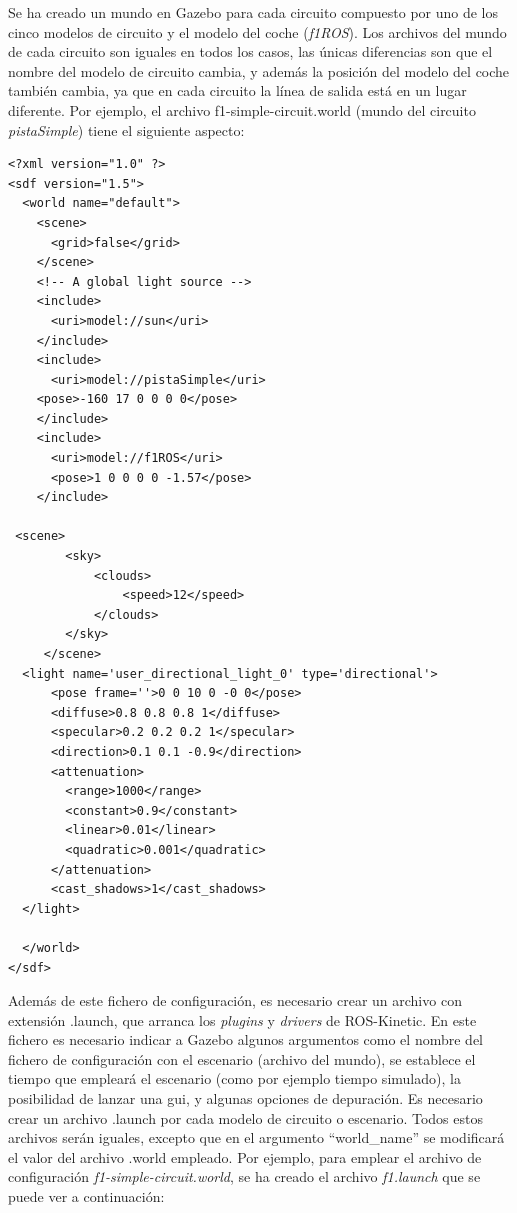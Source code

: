 Se ha creado un mundo en Gazebo para cada circuito compuesto por uno de los cinco modelos de circuito y el modelo del coche (\textit{f1ROS}). Los archivos del mundo de cada circuito son iguales en todos los casos, las únicas diferencias son que el nombre del modelo de circuito cambia, y además la posición del modelo del coche también cambia, ya que en cada circuito la línea de salida está en un lugar diferente. Por ejemplo, el archivo f1-simple-circuit.world (mundo del circuito \textit{pistaSimple}) tiene el
siguiente aspecto:

\vspace{20pt}
\begin{lstlisting}[frame=single]
<?xml version="1.0" ?>
<sdf version="1.5">
  <world name="default">
    <scene>
      <grid>false</grid>
    </scene>
    <!-- A global light source -->
    <include>
      <uri>model://sun</uri>
    </include>
    <include>
      <uri>model://pistaSimple</uri>
	<pose>-160 17 0 0 0 0</pose>
    </include>
    <include>
      <uri>model://f1ROS</uri>
      <pose>1 0 0 0 0 -1.57</pose>
    </include>

 <scene>
        <sky>
            <clouds>
                <speed>12</speed>
            </clouds>
        </sky>
     </scene>
  <light name='user_directional_light_0' type='directional'>
      <pose frame=''>0 0 10 0 -0 0</pose>
      <diffuse>0.8 0.8 0.8 1</diffuse>
      <specular>0.2 0.2 0.2 1</specular>
      <direction>0.1 0.1 -0.9</direction>
      <attenuation>
        <range>1000</range>
        <constant>0.9</constant>
        <linear>0.01</linear>
        <quadratic>0.001</quadratic>
      </attenuation>
      <cast_shadows>1</cast_shadows>
  </light>

  </world>
</sdf>

\end{lstlisting}


Además de este fichero de configuración, es necesario crear un archivo con extensión .launch, que arranca los \textit{plugins} y \textit{drivers} de ROS-Kinetic. En este fichero es necesario indicar a Gazebo algunos argumentos como el nombre del fichero de configuración con el escenario (archivo del mundo), se establece el tiempo que empleará el escenario (como por ejemplo tiempo simulado), la posibilidad de lanzar una \acrshort{gui}, y algunas opciones de depuración. Es necesario crear un archivo .launch por cada modelo de circuito o escenario. Todos estos archivos serán iguales, excepto que en el argumento ``world\_name'' se modificará el valor del archivo .world empleado. Por ejemplo, para emplear el archivo de configuración \textit{f1-simple-circuit.world}, se ha creado el archivo \textit{f1.launch} que se puede ver a continuación:\\

